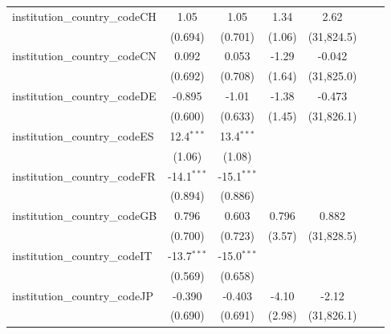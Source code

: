 \begin{tabular}{lcccccc}
   institution\_country\_codeCH          & 1.05           & 1.05           & 1.34          & 2.62          &               &   \\   
                                         & (0.694)        & (0.701)        & (1.06)        & (31,824.5)    &               &   \\   
   institution\_country\_codeCN          & 0.092          & 0.053          & -1.29         & -0.042        &               &   \\   
                                         & (0.692)        & (0.708)        & (1.64)        & (31,825.0)    &               &   \\   
   institution\_country\_codeDE          & -0.895         & -1.01          & -1.38         & -0.473        &               &   \\   
                                         & (0.600)        & (0.633)        & (1.45)        & (31,826.1)    &               &   \\   
   institution\_country\_codeES          & 12.4$^{***}$   & 13.4$^{***}$   &               &               &               &   \\   
                                         & (1.06)         & (1.08)         &               &               &               &   \\   
   institution\_country\_codeFR          & -14.1$^{***}$  & -15.1$^{***}$  &               &               &               &   \\   
                                         & (0.894)        & (0.886)        &               &               &               &   \\   
   institution\_country\_codeGB          & 0.796          & 0.603          & 0.796         & 0.882         &               &   \\   
                                         & (0.700)        & (0.723)        & (3.57)        & (31,828.5)    &               &   \\   
   institution\_country\_codeIT          & -13.7$^{***}$  & -15.0$^{***}$  &               &               &               &   \\   
                                         & (0.569)        & (0.658)        &               &               &               &   \\   
   institution\_country\_codeJP          & -0.390         & -0.403         & -4.10         & -2.12         &               &   \\   
                                         & (0.690)        & (0.691)        & (2.98)        & (31,826.1)    &               &   \\   

\end{tabular}
